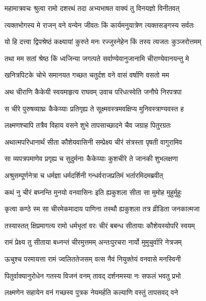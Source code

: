 
\twolineshloka
{महामात्रवचः श्रुत्वा रामो दशरथं तदा}
{अभ्यभाषत वाक्यं तु विनयज्ञो विनीतवत्} %

\twolineshloka
{त्यक्तभोगस्य मे राजन् वने वन्येन जीवतः}
{किं कार्यमनुयात्रेण त्यक्तसङ्गस्य सर्वतः} %

\twolineshloka
{यो हि दत्त्वा द्विपश्रेष्ठं कक्ष्यायां कुरुते मनः}
{रज्जुस्नेहेन किं तस्य त्यजतः कुञ्जरोत्तमम्} %

\twolineshloka
{तथा मम सतां श्रेष्ठ किं ध्वजिन्या जगत्पते}
{सर्वाण्येवानुजानामि चीराण्येवानयन्तु मे} %

\twolineshloka
{खनित्रपिटके चोभे समानयत गच्छत}
{चतुर्दश वने वासं वर्षाणि वसतो मम} %

\twolineshloka
{अथ चीराणि कैकेयी स्वयमाहृत्य राघवम्}
{उवाच परिधत्स्वेति जनौघे निरपत्रपा} %

\twolineshloka
{स चीरे पुरुषव्याघ्रः कैकेय्याः प्रतिगृह्य ते}
{सूक्ष्मवस्त्रमवक्षिप्य मुनिवस्त्राण्यवस्त ह} %

\twolineshloka
{लक्ष्मणश्चापि तत्रैव विहाय वसने शुभे}
{तापसाच्छादने चैव जग्राह पितुरग्रतः} %

\twolineshloka
{अथात्मपरिधानार्थं सीता कौशेयवासिनी}
{सम्प्रेक्ष्य चीरं संत्रस्ता पृषती वागुरामिव} %

\twolineshloka
{सा व्यपत्रपमाणेव प्रगृह्य च सुदुर्मनाः}
{कैकेय्याः कुशचीरे ते जानकी शुभलक्षणा} %

\twolineshloka
{अश्रुसम्पूर्णनेत्रा च धर्मज्ञा धर्मदर्शिनी}
{गन्धर्वराजप्रतिमं भर्तारमिदमब्रवीत्} %

\twolineshloka
{कथं नु चीरं बघ्नन्ति मुनयो वनवासिनः}
{इति ह्यकुशला सीता सा मुमोह मुहुर्मुहुः} %

\twolineshloka
{कृत्वा कण्ठे स्म सा चीरमेकमादाय पाणिना}
{तस्थौ ह्यकुशला तत्र व्रीडिता जनकात्मजा} %

\twolineshloka
{तस्यास्तत् क्षिप्रमागत्य रामो धर्मभृतां वरः}
{चीरं बबन्ध सीतायाः कौशेयस्योपरि स्वयम्} %

\twolineshloka
{रामं प्रेक्ष्य तु सीताया बध्नन्तं चीरमुत्तमम्}
{अन्तःपुरचरा नार्यो मुमुचुर्वारि नेत्रजम्} %

\twolineshloka
{ऊचुश्च परमायत्ता रामं ज्वलिततेजसम्}
{वत्स नैवं नियुक्तेयं वनवासे मनस्विनी} %

\twolineshloka
{पितुर्वाक्यानुरोधेन गतस्य विजनं वनम्}
{तावद् दर्शनमस्या नः सफलं भवतु प्रभो} %

\twolineshloka
{लक्ष्मणेन सहायेन वनं गच्छस्व पुत्रक}
{नेयमर्हति कल्याणि वस्तुं तापसवद् वने} %

